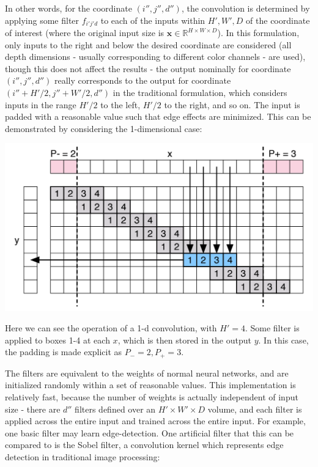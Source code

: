 \documentclass[11pt]{article}
\begin{document}
In other words, for the coordinate $(i'',j'',d'')$, the convolution is determined by applying some filter $f_{i'j'd}$ to each of the inputs within $H',W',D$ of the coordinate of interest (where the original input size is $\mathbf{x} \in \mathbb{R}^{H\times W\times D}$). In this formulation, only inputs to the right and below the desired coordinate are considered (all depth dimensions - usually corresponding to different color channels - are used), though this does not affect the results - the output nominally for coordinate $(i'',j'',d'')$ really corresponds to the output for coordinate $(i''+H'/2,j''+W'/2,d'')$ in the traditional formulation, which considers inputs in the range $H'/2$ to the left, $H'/2$ to the right, and so on. The input is padded with a reasonable value such that edge effects are minimized. This can be demonstrated by considering the 1-dimensional case:
\begin{center}
\includegraphics[scale=.5]{convolution.PNG}
\end{center}

Here we can see the operation of a 1-d convolution, with $H' = 4$. Some filter is applied to boxes 1-4 at each $x$, which is then stored in the output $y$. In this case, the padding is made explicit as $P_{-} = 2, P_{+} = 3$.

The filters are equivalent to the weights of normal neural networks, and are initialized randomly within a set of reasonable values. This implementation is relatively fast, because the number of weights is actually independent of input size - there are $d''$ filters defined over an $H'\times W' \times D$ volume, and each filter is applied across the entire input and trained across the entire input. For example, one basic filter may learn edge-detection. One artificial filter that this can be compared to is the Sobel filter, a convolution kernel which represents edge detection in traditional image processing:
\end{document}
